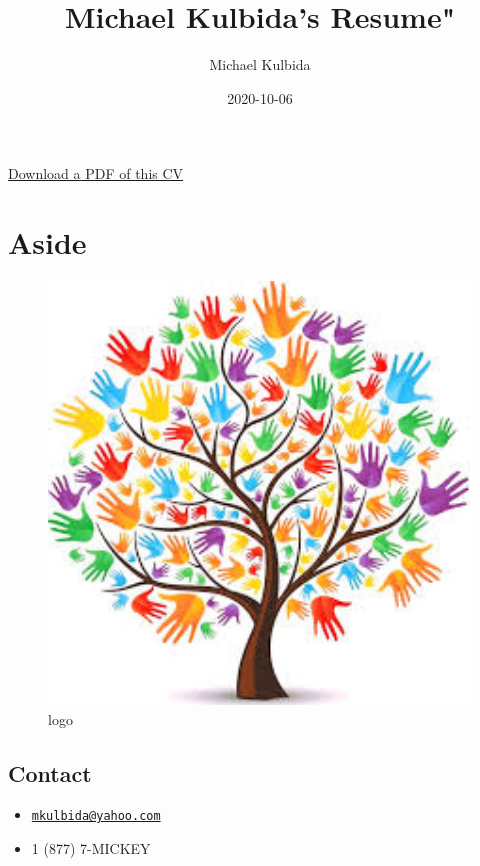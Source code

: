 \documentclass[
]{article}
\title{Michael Kulbida's Resume"}
\author{Michael Kulbida}
\date{2020-10-06}
\providecommand{\tightlist}{%
  \setlength{\itemsep}{0pt}\setlength{\parskip}{0pt}}
\begin{document}
\maketitle

\href{https://github.com/nstrayer/cv/raw/master/strayer_cv.pdf}{
Download a PDF of this CV}

\hypertarget{aside}{%
\section{Aside}\label{aside}}

\begin{figure}
\centering
\includegraphics[width=1\textwidth,height=\textheight]{social work.jpg}
\caption{logo}
\end{figure}

\hypertarget{contact}{%
\subsection{Contact}\label{contact}}

\begin{itemize}
\tightlist
\item
  \href{mailto:mkulbida@yahoo.com}{\nolinkurl{mkulbida@yahoo.com}}
\item
  1 (877) 7-MICKEY
\end{itemize}
\end{document}
